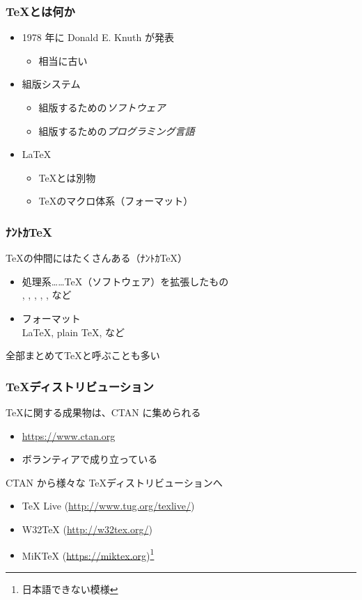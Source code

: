 \begin{frame}
	\frametitle{\TeX とは何か}
	\begin{itemize}
		\item 1978 年に Donald E. Knuth が発表
			\begin{itemize}
				\item 相当に古い
			\end{itemize}
		\item 組版システム
			\begin{itemize}
				\item 組版するための\emph{ソフトウェア}
				\item 組版するための\emph{プログラミング言語}
			\end{itemize}
			\pause
		\item \LaTeX
			\begin{itemize}
				\item \TeX とは別物
				\item \TeX のマクロ体系（フォーマット）
			\end{itemize}
	\end{itemize}
\end{frame}

\begin{frame}
	\frametitle{ﾅﾝﾄｶ\TeX}
	\TeX の仲間にはたくさんある（ﾅﾝﾄｶ\TeX ）
	\begin{itemize}
		\item 処理系……\TeX （ソフトウェア）を拡張したもの\\
			{\eTeX}, {\pdfTeX}, {\XeTeX}, {\LuaTeX}, {\pTeX}, {\upTeX} など
		\item フォーマット\\
			{\LaTeX}, {plain \TeX}, {\ConTeXt} など
	\end{itemize}
	全部まとめて\TeX と呼ぶことも多い
\end{frame}

\begin{frame}
	\frametitle{\TeX ディストリビューション}
	\TeX に関する成果物は、CTAN に集められる
	\begin{itemize}
		\item \url{https://www.ctan.org}
		\item ボランティアで成り立っている
	\end{itemize}

	CTAN から様々な \TeX ディストリビューションへ
	\begin{itemize}
		\item {\TeX} Live (\url{http://www.tug.org/texlive/})
		\item W32TeX (\url{http://w32tex.org/})
		\item MiK{\TeX} (\url{https://miktex.org})\footnote{日本語できない模様}
	\end{itemize}
\end{frame}

